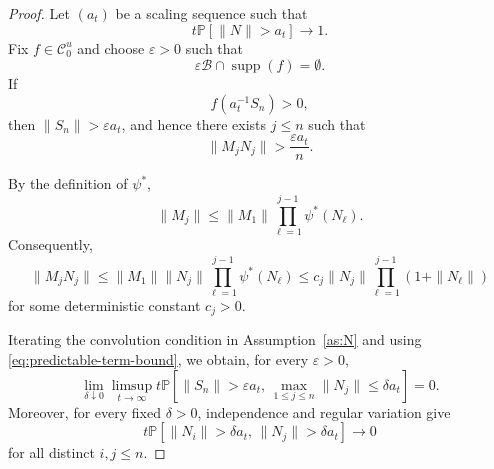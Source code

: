 \documentclass[preprint,12pt]{elsarticle}
\theoremstyle{definition}
\theoremstyle{remark}
\newcommand{\Mbf}{{ M}}
\newcommand{\Nbf}{{ N}}
\newcommand{\Sbf}{{ S}}
\newcommand{\1}{{\mathbf 1}}
\numberwithin{equation}{section}
\newcommand{\Pbb}{\mathbb{P}}
\newcommand{\Bcal}{\mathcal{B}}
\newcommand{\Ccal}{\mathcal{C}}
\begin{document}
  \begin{proof}
    Let $(a_t)$ be a scaling sequence such that
    \begin{equation*}
      t\Pbb[\|\Nbf\|>a_t]\longrightarrow1.
    \end{equation*}
    Fix $f\in\Ccal_0^u$ and choose $\varepsilon>0$ such that
    \begin{equation*}
      \varepsilon\Bcal\cap\operatorname{supp}(f)=\emptyset.
    \end{equation*}
    If
    \begin{equation*}
      f(a_t^{-1}\Sbf_n)>0,
    \end{equation*}
    then $\|\Sbf_n\|>\varepsilon a_t$, and hence there exists
    $j\leq n$ such that
    \begin{equation*}
      \|\Mbf_j\Nbf_j\|>\frac{\varepsilon a_t}{n}.
    \end{equation*}

    By the definition of $\psi^*$,
    \begin{equation*}
      \|\Mbf_j\|
      \leq
      \|\Mbf_1\|
      \prod_{\ell=1}^{j-1}\psi^*(\Nbf_\ell).
    \end{equation*}
    Consequently,
    \begin{equation}\label{eq:predictable-term-bound}
      \|\Mbf_j\Nbf_j\|
      \leq
      \|\Mbf_1\|\|\Nbf_j\|
      \prod_{\ell=1}^{j-1}\psi^*(\Nbf_\ell)
      \leq
      c_j\|\Nbf_j\|
      \prod_{\ell=1}^{j-1}(1+\|\Nbf_\ell\|)
    \end{equation}
    for some deterministic constant $c_j>0$.

    Iterating the convolution condition in Assumption~\ref{as:N} and
    using \eqref{eq:predictable-term-bound}, we obtain, for every
    $\varepsilon>0$,
    \begin{equation}\label{eq:predictable-no-large-innovation}
      \lim_{\delta\downarrow0}
      \limsup_{t\to\infty}
      t\Pbb\left[
        \|\Sbf_n\|>\varepsilon a_t,\,
        \max_{1\leq j\leq n}\|\Nbf_j\|\leq\delta a_t
      \right]
      =0.
    \end{equation}
    Moreover, for every fixed $\delta>0$, independence and regular
    variation give
    \begin{equation}\label{eq:predictable-two-large-innovations}
      t\Pbb\left[
        \|\Nbf_i\|>\delta a_t,\,
        \|\Nbf_j\|>\delta a_t
      \right]
      \longrightarrow0
    \end{equation}
    for all distinct $i,j\leq n$.


\end{proof}
\end{document}
